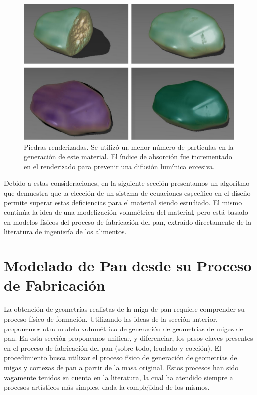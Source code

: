 \begin{figure}
  \centerline{\includegraphics[width=12cm]{figures/Fig14CAVW}}
  \caption{Piedras renderizadas. Se utilizó un menor número de partículas en la generación de este material. El índice de absorción fue incrementado en el renderizado para prevenir una difusión lumínica excesiva.}
  \label{fg:Fig14}
\end{figure}

Debido a estas consideraciones, en la siguiente sección presentamos un algoritmo que demuestra que la elección de un sistema de ecuaciones específico en el diseño permite superar estas deficiencias para el material siendo estudiado.
El mismo continúa la idea de una modelización volumétrica del material, pero está basado en modelos físicos del proceso de fabricación del pan, extraído directamente de la literatura de ingeniería de los alimentos.

\section{Modelado de Pan desde su Proceso de Fabricación}
La obtención de geometrías realistas de la miga de pan requiere comprender su proceso físico de formación.
Utilizando las ideas de la sección anterior, proponemos otro modelo volumétrico de generación de geometrías de migas de pan.
En esta sección proponemos unificar, y diferenciar, los pasos claves presentes en el proceso de fabricación del pan (sobre todo, leudado y cocción).
El procedimiento busca utilizar el proceso físico de generación de geometrías de migas y cortezas de pan a partir de la masa original.
Estos procesos han sido vagamente tenidos en cuenta en la literatura, la cual ha atendido siempre a procesos artísticos más simples, dada la complejidad de los mismos.


